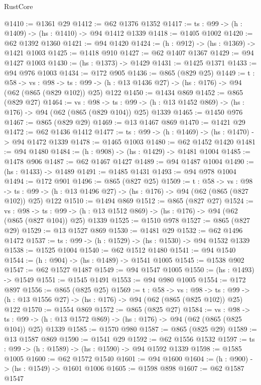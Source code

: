\begin{lexlean}{RustCore}
\begin{coremodule}
@1410 := @1361 @29
@1412 := @62 @1376 @1352
@1417 := {ts : @99} -> (h : @1409) -> (hs : @1410) -> @94 @1412 @1339
@1418 := @1405 @1002
@1420 := @62 @1392 @1360
@1421 := @94 @1420
@1424 := (h : @912) -> (hs : @1369) -> @1421 @1003
@1425 := @1418 @910
@1427 := @62 @1407 @1367
@1429 := @94 @1427 @1003
@1430 := (hs : @1373) -> @1429
@1431 := @1425 @1371
@1433 := @94 @976 @1003
@1434 := @172 @905
@1436 := @865 (@829 @25)
@1449 := {t : @58} ->
  {vs : @98} ->
  {ts : @99} -> (h : @13 @1436 @27) -> (hs : @176) -> @94 (@62 (@865 (@829 @102)) @25) @122
@1450 := @1434 @869
@1452 := @865 (@829 @27)
@1464 := {vs : @98} ->
  {ts : @99} -> (h : @13 @1452 @869) -> (hs : @176) -> @94 (@62 (@865 (@829 @104)) @25) @1339
@1465 := @1450 @976
@1467 := @865 (@829 @29)
@1469 := @13 @1467 @869
@1470 := @1421 @29
@1472 := @62 @1436 @1412
@1477 := {ts : @99} -> (h : @1469) -> (hs : @1470) -> @94 @1472 @1339
@1478 := @1465 @1003
@1480 := @62 @1452 @1420
@1481 := @94 @1480
@1484 := (h : @908) -> (hs : @1429) -> @1481 @1004
@1485 := @1478 @906
@1487 := @62 @1467 @1427
@1489 := @94 @1487 @1004
@1490 := (hs : @1433) -> @1489
@1491 := @1485 @1431
@1493 := @94 @978 @1004
@1494 := @172 @901
@1496 := @865 (@827 @25)
@1509 := {t : @58} ->
  {vs : @98} ->
  {ts : @99} -> (h : @13 @1496 @27) -> (hs : @176) -> @94 (@62 (@865 (@827 @102)) @25) @122
@1510 := @1494 @869
@1512 := @865 (@827 @27)
@1524 := {vs : @98} ->
  {ts : @99} -> (h : @13 @1512 @869) -> (hs : @176) -> @94 (@62 (@865 (@827 @104)) @25) @1339
@1525 := @1510 @978
@1527 := @865 (@827 @29)
@1529 := @13 @1527 @869
@1530 := @1481 @29
@1532 := @62 @1496 @1472
@1537 := {ts : @99} -> (h : @1529) -> (hs : @1530) -> @94 @1532 @1339
@1538 := @1525 @1004
@1540 := @62 @1512 @1480
@1541 := @94 @1540
@1544 := (h : @904) -> (hs : @1489) -> @1541 @1005
@1545 := @1538 @902
@1547 := @62 @1527 @1487
@1549 := @94 @1547 @1005
@1550 := (hs : @1493) -> @1549
@1551 := @1545 @1491
@1553 := @94 @980 @1005
@1554 := @172 @897
@1556 := @865 (@825 @25)
@1569 := {t : @58} ->
  {vs : @98} ->
  {ts : @99} -> (h : @13 @1556 @27) -> (hs : @176) -> @94 (@62 (@865 (@825 @102)) @25) @122
@1570 := @1554 @869
@1572 := @865 (@825 @27)
@1584 := {vs : @98} ->
  {ts : @99} -> (h : @13 @1572 @869) -> (hs : @176) -> @94 (@62 (@865 (@825 @104)) @25) @1339
@1585 := @1570 @980
@1587 := @865 (@825 @29)
@1589 := @13 @1587 @869
@1590 := @1541 @29
@1592 := @62 @1556 @1532
@1597 := {ts : @99} -> (h : @1589) -> (hs : @1590) -> @94 @1592 @1339
@1598 := @1585 @1005
@1600 := @62 @1572 @1540
@1601 := @94 @1600
@1604 := (h : @900) -> (hs : @1549) -> @1601 @1006
@1605 := @1598 @898
@1607 := @62 @1587 @1547

\end{coremodule}
\end{lexlean}
